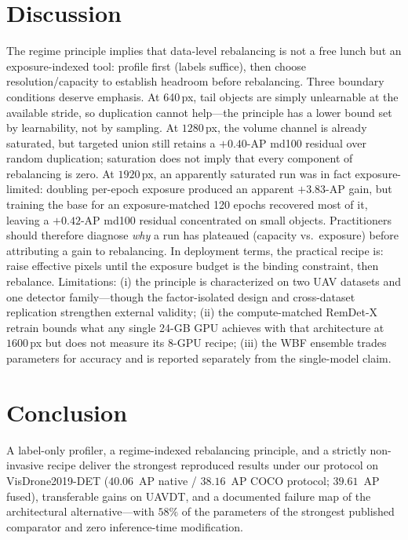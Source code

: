 \documentclass[journal]{IEEEtran}
\newcommand{\ap}{\textup{AP}}
\newcommand{\remdet}{RemDet-X}
\newcommand{\visdrone}{VisDrone2019-DET}
\newcommand{\uavdt}{UAVDT}
\begin{document}
\section{Discussion}
The regime principle implies that data-level rebalancing is not a free lunch but an exposure-indexed tool: profile first (labels suffice), then choose resolution/capacity to establish headroom before rebalancing. Three boundary conditions deserve emphasis. At 640\,px, tail objects are simply unlearnable at the available stride, so duplication cannot help---the principle has a lower bound set by learnability, not by sampling. At $1280$\,px, the volume channel is already saturated, but targeted union still retains a $+0.40$-\ap{} md100 residual over random duplication; saturation does not imply that every component of rebalancing is zero. At $1920$\,px, an apparently saturated run was in fact exposure-limited: doubling per-epoch exposure produced an apparent $+3.83$-\ap{} gain, but training the base for an exposure-matched 120 epochs recovered most of it, leaving a $+0.42$-\ap{} md100 residual concentrated on small objects. Practitioners should therefore diagnose \emph{why} a run has plateaued (capacity vs.\ exposure) before attributing a gain to rebalancing. In deployment terms, the practical recipe is: raise effective pixels until the exposure budget is the binding constraint, then rebalance. Limitations: (i) the principle is characterized on two UAV datasets and one detector family---though the factor-isolated design and cross-dataset replication strengthen external validity; (ii) the compute-matched \remdet{} retrain bounds what any single 24-GB GPU achieves with that architecture at $1600$\,px but does not measure its 8-GPU recipe; (iii) the WBF ensemble trades parameters for accuracy and is reported separately from the single-model claim.

\section{Conclusion}
A label-only profiler, a regime-indexed rebalancing principle, and a strictly non-invasive recipe deliver the strongest reproduced results under our protocol on \visdrone{} ($40.06$~\ap{} native / $38.16$~\ap{} COCO protocol; $39.61$~\ap{} fused), transferable gains on \uavdt{}, and a documented failure map of the architectural alternative---with $58\%$ of the parameters of the strongest published comparator and zero inference-time modification.

\appendix

\end{document}
